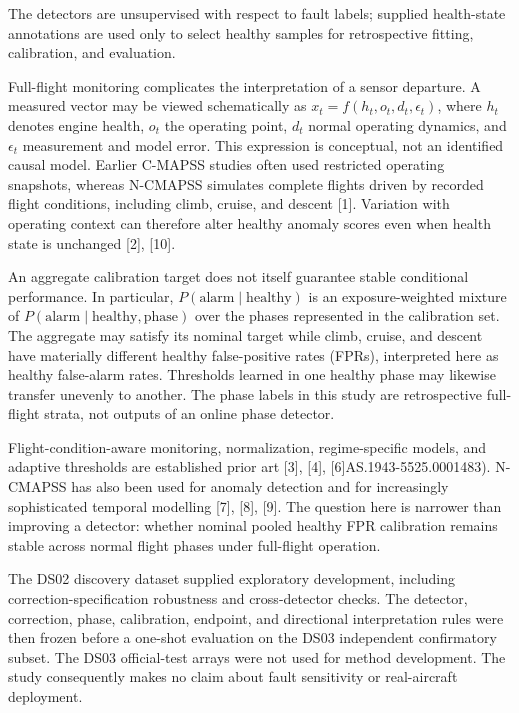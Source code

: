 \documentclass[10pt,conference]{IEEEtran}
\begin{document}
The detectors are unsupervised with respect to fault labels; supplied health-state annotations are used only to select healthy samples for retrospective fitting, calibration, and evaluation.

Full-flight monitoring complicates the interpretation of a sensor departure. A measured vector may be viewed schematically as \(x_t=f(h_t,o_t,d_t,\epsilon_t)\), where \(h_t\) denotes engine health, \(o_t\) the operating point, \(d_t\) normal operating dynamics, and \(\epsilon_t\) measurement and model error. This expression is conceptual, not an identified causal model. Earlier C-MAPSS studies often used restricted operating snapshots, whereas N-CMAPSS simulates complete flights driven by recorded flight conditions, including climb, cruise, and descent {[}1{]}. Variation with operating context can therefore alter healthy anomaly scores even when health state is unchanged {[}2{]}, {[}10{]}.

An aggregate calibration target does not itself guarantee stable conditional performance. In particular, \(P(\mathrm{alarm}\mid\mathrm{healthy})\) is an exposure-weighted mixture of \(P(\mathrm{alarm}\mid\mathrm{healthy},\mathrm{phase})\) over the phases represented in the calibration set. The aggregate may satisfy its nominal target while climb, cruise, and descent have materially different healthy false-positive rates (FPRs), interpreted here as healthy false-alarm rates. Thresholds learned in one healthy phase may likewise transfer unevenly to another. The phase labels in this study are retrospective full-flight strata, not outputs of an online phase detector.

Flight-condition-aware monitoring, normalization, regime-specific models, and adaptive thresholds are established prior art {[}3{]}, {[}4{]}, {[}6{]}AS.1943-5525.0001483). N-CMAPSS has also been used for anomaly detection and for increasingly sophisticated temporal modelling {[}7{]}, {[}8{]}, {[}9{]}. The question here is narrower than improving a detector: whether nominal pooled healthy FPR calibration remains stable across normal flight phases under full-flight operation.

The DS02 discovery dataset supplied exploratory development, including correction-specification robustness and cross-detector checks. The detector, correction, phase, calibration, endpoint, and directional interpretation rules were then frozen before a one-shot evaluation on the DS03 independent confirmatory subset. The DS03 official-test arrays were not used for method development. The study consequently makes no claim about fault sensitivity or real-aircraft deployment.
\end{document}
